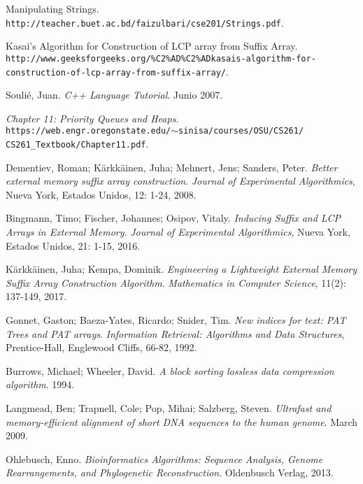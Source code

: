 \documentclass[letterpaper, 10pt, notitlepage]{report}
\begin{document}
\begin{thebibliography}{9}
Manipulating Strings.
\\\texttt{http://teacher.buet.ac.bd/faizulbari/cse201/Strings.pdf}.

Kasai’s Algorithm for Construction of LCP array from Suffix Array.
\\\texttt{http://www.geeksforgeeks.org/\%C2\%AD\%C2\%ADkasais-algorithm-for-}
\\\texttt{construction-of-lcp-array-from-suffix-array/}.

Soulié, Juan.
\textit{C++ Language Tutorial}. Junio 2007.

\textit{Chapter 11: Priority Queues and Heaps}.
\\\texttt{https://web.engr.oregonstate.edu/$\sim$sinisa/courses/OSU/CS261/}
\\\texttt{CS261\_Textbook/Chapter11.pdf}. 

Dementiev, Roman; Kärkkäinen, Juha; Mehnert, Jens; Sanders, Peter.
\textit{Better external memory suffix array construction}.
\textit{Journal of Experimental Algorithmics}, Nueva York, Estados Unidos, 12: 1-24, 2008.

Bingmann, Timo; Fischer, Johannes; Osipov, Vitaly.
\textit{Inducing Suffix and LCP Arrays in External Memory}.
\textit{Journal of Experimental Algorithmics}, Nueva York, Estados Unidos, 21: 1-15, 2016.

Kärkkäinen, Juha; Kempa, Dominik.
\textit{Engineering a Lightweight External Memory Suffix Array Construction Algorithm}.
\textit{Mathematics in Computer Science}, 11(2): 137-149, 2017.

Gonnet, Gaston; Baeza-Yates, Ricardo; Snider, Tim.
\textit{New indices for text: PAT Trees and PAT arrays}.
\textit{Information Retrieval: Algorithms and Data Structures}, Prentice-Hall, Englewood Cliffs, 66-82, 1992.

Burrows, Michael; Wheeler, David.
\textit{A block sorting lossless data compression algorithm}. 1994.

Langmead, Ben; Trapnell, Cole; Pop, Mihai; Salzberg, Steven.
\textit{Ultrafast and memory-efficient alignment of short DNA sequences to the human genome}. March 2009.

Ohlebusch, Enno.
\textit{Bioinformatics Algorithms: Sequence Analysis, Genome Rearrangements, and Phylogenetic Reconstruction}. 
Oldenbusch Verlag, 2013.


\end{thebibliography}
\end{document}
